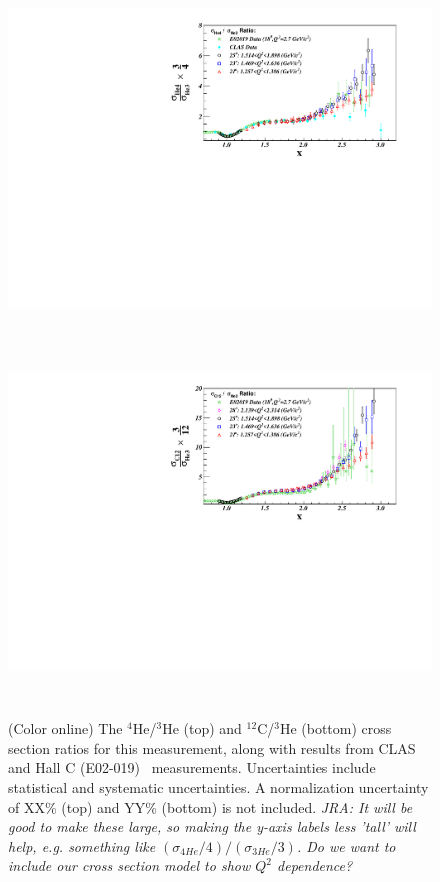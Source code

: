                 \begin{figure}[!ht]
		\begin{center}
		  \includegraphics[height=9.5cm,angle=270]{./figures/He4_He3_XS_Ratio_June30_L}
                  \includegraphics[height=9.5cm,angle=270]{./figures/C12_He3_XS_Ratio_June30_L}
		\end{center}
		\vspace*{-5mm}
		\caption{(Color online) The $^4$He/$^3$He (top) and $^{12}$C/$^3$He (bottom) cross section ratios for this
		  measurement, along with results from CLAS~\cite{PhysRevLett.96.082501} and Hall C (E02-019)~\cite{fomin2012} measurements.
                  Uncertainties include statistical and systematic uncertainties. A normalization uncertainty of XX\% (top) and YY\% (bottom)
		  is not included. \textit{JRA: It will be good to make these large, so making the y-axis labels less 'tall' will help, e.g.
		  something like $(\sigma_{4He}/4)/(\sigma_{3He}/3)$. Do we want to include our cross section model to show $Q^2$ dependence?}}
		\label{ratios}
		\end{figure}

